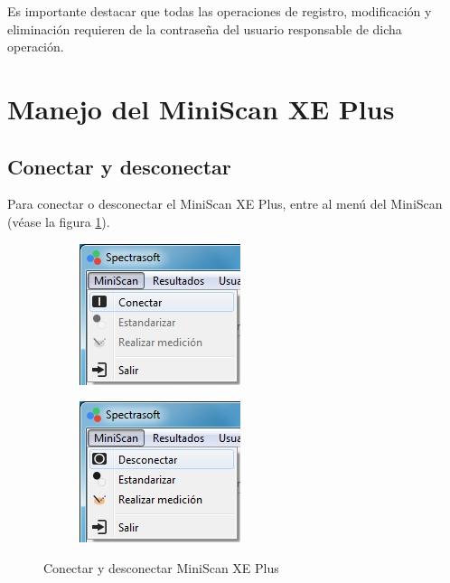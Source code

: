	Es importante destacar que todas las operaciones de registro, modificaci\'{o}n y eliminaci\'{o}n requieren de la contrase\~{n}a del usuario responsable de dicha operaci\'{o}n.
	
\newpage

\section*{Manejo del MiniScan XE Plus}

	\subsection*{Conectar y desconectar}
		Para conectar o desconectar el MiniScan XE Plus, entre al men\'{u} del MiniScan (v\'{e}ase la figura \ref{fig:conectar-desconectar}).

\begin{figure}[H]
\centering
\begin{subfigure}{.5\textwidth}
  \centering
  \includegraphics[width=.6\linewidth]{./img/conectar.jpg}
\end{subfigure}%
\begin{subfigure}{.5\textwidth}
  \centering
  \includegraphics[width=.6\linewidth]{./img/desconectar.jpg}
\end{subfigure}
\caption[]{Conectar y desconectar MiniScan XE Plus\label{fig:conectar-desconectar}}
\end{figure}

